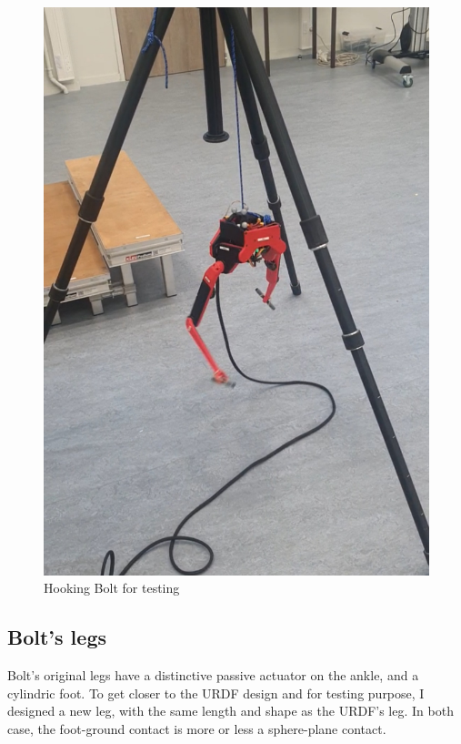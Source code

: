 \documentclass[a4paper,10pt]{article}
\begin{document}
\begin{figure}[H]
\centering
  \includegraphics[width=\linewidth, angle=0, scale=0.3]{./images/Bolt_testing.jpg}
  \caption{Hooking Bolt for testing}
  \label{New Bolt hat}
\end{figure}



\subsection{Bolt's legs}
Bolt's original legs have a distinctive passive actuator on the ankle, and a cylindric foot. To get closer to the URDF design and for testing purpose, I designed a new leg, with the same length and shape as the URDF's leg. In both case, the foot-ground contact is more or less a sphere-plane contact.
\end{document}
